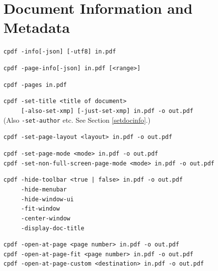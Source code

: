 \documentclass{book}
\begin{document}
\chapter{Document Information and Metadata}\label{chap:11}
\pagestyle{fancy}
  \begin{framed}

    \small\noindent\verb!cpdf -info[-json] [-utf8] in.pdf!

    \vspace{1.5mm}
    \small\noindent\verb!cpdf -page-info[-json] in.pdf [<range>]!

    \vspace{1.5mm}
    \small\noindent\verb!cpdf -pages in.pdf!

    \vspace{1.5mm}
    \small\noindent\verb!cpdf -set-title <title of document>!\\
    \small\noindent\verb!     [-also-set-xmp] [-just-set-xmp] in.pdf -o out.pdf!\\
    (Also \texttt{-set-author} etc. See Section \ref{setdocinfo}.)

    \vspace{1.5mm}
    \small\noindent\verb!cpdf -set-page-layout <layout> in.pdf -o out.pdf!

    \vspace{1.5mm}
    \small\noindent\verb!cpdf -set-page-mode <mode> in.pdf -o out.pdf!\\
    \small\noindent\verb!cpdf -set-non-full-screen-page-mode <mode> in.pdf -o out.pdf!



    \vspace{1.5mm} 
    \small\noindent\verb!cpdf -hide-toolbar <true | false> in.pdf -o out.pdf!\\
    \noindent\verb!     -hide-menubar!\\
    \noindent\verb!     -hide-window-ui!\\
    \noindent\verb!     -fit-window!\\
    \noindent\verb!     -center-window!\\
    \noindent\verb!     -display-doc-title!
    
    \vspace{1.5mm}
    \small\noindent\verb!cpdf -open-at-page <page number> in.pdf -o out.pdf!\\
    \noindent\verb!cpdf -open-at-page-fit <page number> in.pdf -o out.pdf!\\
    \noindent\verb!cpdf -open-at-page-custom <destination> in.pdf -o out.pdf!


\end{framed}
\end{document}
